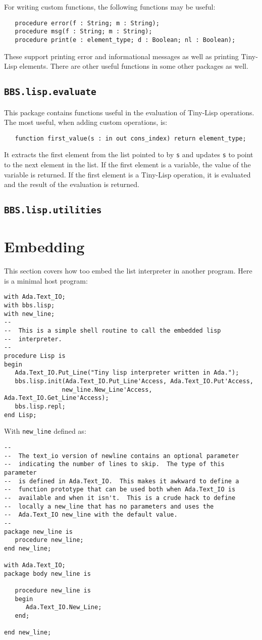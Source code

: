 \documentclass[10pt, openany]{book}
\newcommand{\package}[1]{\texttt{#1}}
\newcommand{\function}[1]{\texttt{#1}}
\newcommand{\keyword}[1]{\texttt{#1}}
\newcommand{\tl}{Tiny-Lisp}
\begin{document}
For writing custom functions, the following functions may be useful:
\begin{lstlisting}
   procedure error(f : String; m : String);
   procedure msg(f : String; m : String);
   procedure print(e : element_type; d : Boolean; nl : Boolean);
\end{lstlisting}
These support printing error and informational messages as well as printing \tl{} elements.  There are other useful functions in some other packages as well.
\subsection{\package{BBS.lisp.evaluate}}
This package contains functions useful in the evaluation of \tl{} operations.  The most useful, when adding custom operations, is:
\begin{lstlisting}
   function first_value(s : in out cons_index) return element_type;
\end{lstlisting}
It extracts the first element from the list pointed to by \keyword{s} and updates \keyword{s} to point to the next element in the list.  If the first element is a variable, the value of the variable is returned.  If the first element is a \tl{} operation, it is evaluated and the result of the evaluation is returned.

\subsection{\package{BBS.lisp.utilities}}

\section{Embedding}
This section covers how too embed the list interpreter in another program.  Here is a minimal host program:
\begin{lstlisting}
with Ada.Text_IO;
with bbs.lisp;
with new_line;
--
--  This is a simple shell routine to call the embedded lisp
--  interpreter.
--
procedure Lisp is
begin
   Ada.Text_IO.Put_Line("Tiny lisp interpreter written in Ada.");
   bbs.lisp.init(Ada.Text_IO.Put_Line'Access, Ada.Text_IO.Put'Access,
                new_line.New_Line'Access, Ada.Text_IO.Get_Line'Access);
   bbs.lisp.repl;
end Lisp;
\end{lstlisting}

With \function{new\_line} defined as:
\begin{lstlisting}
--
--  The text_io version of newline contains an optional parameter
--  indicating the number of lines to skip.  The type of this parameter
--  is defined in Ada.Text_IO.  This makes it awkward to define a
--  function prototype that can be used both when Ada.Text_IO is
--  available and when it isn't.  This is a crude hack to define
--  locally a new_line that has no parameters and uses the
--  Ada.Text_IO new_line with the default value.
--
package new_line is
   procedure new_line;
end new_line;

with Ada.Text_IO;
package body new_line is

   procedure new_line is
   begin
      Ada.Text_IO.New_Line;
   end;

end new_line;
\end{lstlisting}
\end{document}
